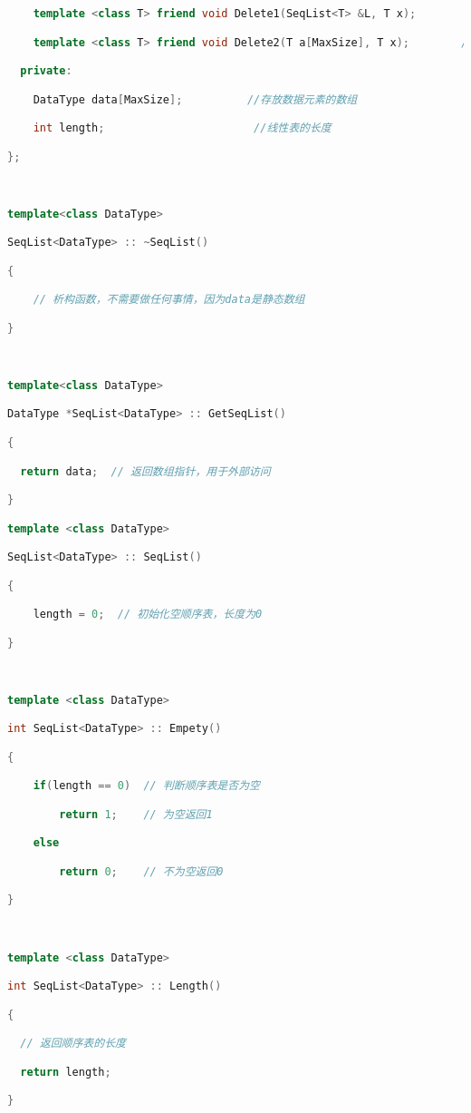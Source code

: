\begin{lstlisting}[language=C++]
    template <class T> friend void Delete1(SeqList<T> &L, T x);        //**在顺序表中删除所有元素值为x的元素，要求空间复杂度为O(1)

    template <class T> friend void Delete2(T a[MaxSize], T x);        //**在顺序表中删除所有元素值为x的元素，要求空间复杂度为O(1)

  private:

    DataType data[MaxSize];          //存放数据元素的数组

    int length;                       //线性表的长度

};

  

template<class DataType>

SeqList<DataType> :: ~SeqList()

{

    // 析构函数，不需要做任何事情，因为data是静态数组    

}

  

template<class DataType>

DataType *SeqList<DataType> :: GetSeqList()

{

  return data;  // 返回数组指针，用于外部访问

}

template <class DataType>

SeqList<DataType> :: SeqList()

{

    length = 0;  // 初始化空顺序表，长度为0

}

  

template <class DataType>

int SeqList<DataType> :: Empety()

{

    if(length == 0)  // 判断顺序表是否为空

        return 1;    // 为空返回1

    else

        return 0;    // 不为空返回0

}

  

template <class DataType>

int SeqList<DataType> :: Length()

{

  // 返回顺序表的长度

  return length;

}


\end{lstlisting}
